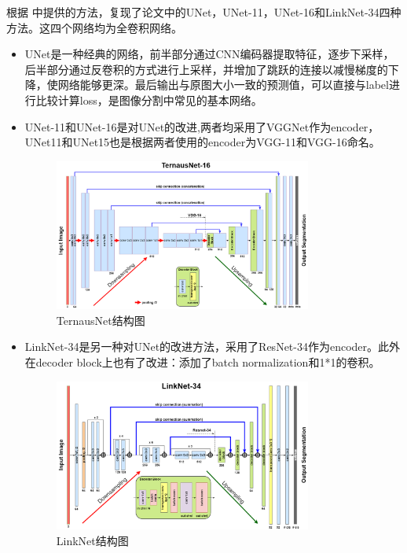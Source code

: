 \documentclass[UTF8]{ctexart}
\begin{document}
根据%
中提供的方法，复现了论文中的UNet，UNet-11，UNet-16和LinkNet-34四种方法。这四个网络均为全卷积网络。
\begin{itemize}
    \item UNet是一种经典的网络，前半部分通过CNN编码器提取特征，逐步下采样，后半部分通过反卷积的方式进行上采样，并增加了跳跃的连接以减慢梯度的下降，使网络能够更深。最后输出与原图大小一致的预测值，可以直接与label进行比较计算loss，是图像分割中常见的基本网络。
    \item UNet-11和UNet-16是对UNet的改进,两者均采用了VGGNet作为encoder，UNet11和UNet15也是根据两者使用的encoder为VGG-11和VGG-16命名。
    \begin{figure}[H]
        \centering  %
        \includegraphics[width=0.8\textwidth]{figure/TernausNet.png}
        \caption{TernausNet结构图}
    \end{figure}
    \item LinkNet-34是另一种对UNet的改进方法，采用了ResNet-34作为encoder。此外在decoder block上也有了改进：添加了batch normalization和1*1的卷积。
    \begin{figure}[H]
        \centering  %
        \includegraphics[width=0.8\textwidth]{figure/LinkNet34.png}
        \caption{LinkNet结构图}
    \end{figure}
\end{itemize}
\end{document}
